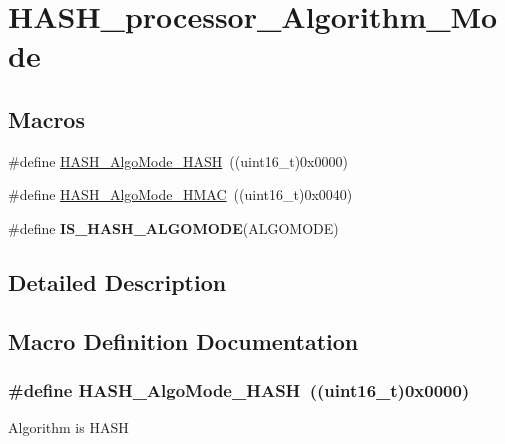 \hypertarget{group___h_a_s_h__processor___algorithm___mode}{\section{H\-A\-S\-H\-\_\-processor\-\_\-\-Algorithm\-\_\-\-Mode}
\label{group___h_a_s_h__processor___algorithm___mode}
}
\subsection*{Macros}
\begin{DoxyCompactItemize}
\item 
\#define \hyperlink{group___h_a_s_h__processor___algorithm___mode_ga4de18ef48bad8fe403226abe769bd921}{H\-A\-S\-H\-\_\-\-Algo\-Mode\-\_\-\-H\-A\-S\-H}~((uint16\-\_\-t)0x0000)
\item 
\#define \hyperlink{group___h_a_s_h__processor___algorithm___mode_ga70224c1ea0eef2f45363f92fc001a875}{H\-A\-S\-H\-\_\-\-Algo\-Mode\-\_\-\-H\-M\-A\-C}~((uint16\-\_\-t)0x0040)
\item 
\#define {\bfseries I\-S\-\_\-\-H\-A\-S\-H\-\_\-\-A\-L\-G\-O\-M\-O\-D\-E}(A\-L\-G\-O\-M\-O\-D\-E)
\end{DoxyCompactItemize}


\subsection{Detailed Description}


\subsection{Macro Definition Documentation}
\hypertarget{group___h_a_s_h__processor___algorithm___mode_ga4de18ef48bad8fe403226abe769bd921}{
\subsubsection[{H\-A\-S\-H\-\_\-\-Algo\-Mode\-\_\-\-H\-A\-S\-H}]{\setlength{\rightskip}{0pt plus 5cm}\#define H\-A\-S\-H\-\_\-\-Algo\-Mode\-\_\-\-H\-A\-S\-H~((uint16\-\_\-t)0x0000)}}\label{group___h_a_s_h__processor___algorithm___mode_ga4de18ef48bad8fe403226abe769bd921}
Algorithm is H\-A\-S\-H 

